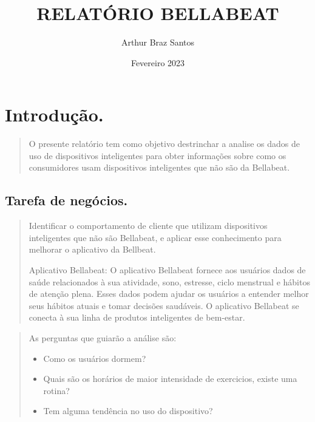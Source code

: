 \documentclass[a4paper, oneside]{report}
\title{RELATÓRIO BELLABEAT}
\author{Arthur Braz Santos}
\date{Fevereiro 2023}
\begin{document}
\maketitle
\tableofcontents   

\chapter*{Introdução.}

\begin{quotation}
O presente relatório tem como objetivo destrinchar a analise os dados de uso de dispositivos inteligentes para obter informações sobre como os consumidores usam dispositivos inteligentes que não são da Bellabeat. 
\end{quotation}


\section*{Tarefa de negócios.}
\begin{quotation}
Identificar o comportamento de cliente que utilizam dispositivos inteligentes que não são Bellabeat, e aplicar esse conhecimento para melhorar o aplicativo da Bellbeat.

Aplicativo Bellabeat: O aplicativo Bellabeat fornece aos usuários dados de saúde relacionados à sua atividade, sono, estresse, ciclo menstrual e hábitos de atenção plena. Esses dados podem ajudar os usuários a entender melhor seus hábitos atuais e tomar decisões saudáveis. O aplicativo Bellabeat se conecta à sua linha de produtos inteligentes de bem-estar.
\end{quotation}


\begin{quotation}
As perguntas que guiarão a análise são:
\begin{itemize}
\item Como os usuários dormem?
\item Quais são os horários de maior intensidade de exercicios, existe uma rotina?
\item Tem alguma tendência no uso do dispositivo?
\end{itemize}
\end{quotation}
\end{document}
